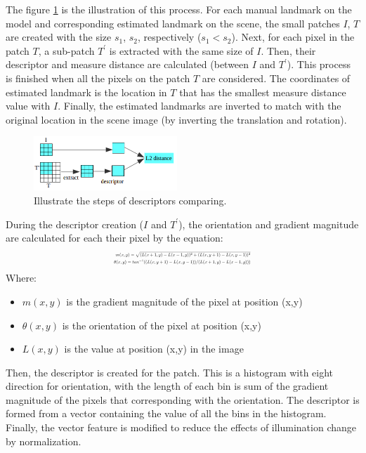\documentclass[twoside,twocolumn,10pt]{article}
\begin{document}
The figure \ref{fig:Illustrate} is the illustration of this process. For each manual landmark on the model and corresponding estimated landmark on the scene, the small patches \textit{$I$}, \textit{$T$} are created with the size $s_1$, $s_2$, respectively ($s_1 < s_2$). Next, for each pixel in the patch \textit{$T$}, a sub-patch \textit{$T^{'}$} is extracted with the same size of \textit{$I$}. Then, their descriptor and measure distance are calculated (between \textit{$I$} and \textit{$T^{'}$}). This process is finished when all the pixels on the patch \textit{$T$} are considered. The coordinates of estimated landmark is the location in \textit{$T$} that has the smallest measure distance value with \textit{$I$}. Finally, the estimated landmarks are inverted to match with the original location in the scene image (by inverting the translation and rotation).
\begin{figure}[htb]
    \centering
    \includegraphics[width=0.48\textwidth]{./images/illustration_SIFT}
    \caption{Illustrate the steps of descriptors comparing.}
    \label{fig:Illustrate}
\end{figure}

During the descriptor creation (\textit{$I$} and \textit{$T^{'}$}), the orientation and gradient magnitude are calculated for each their pixel by the equation:
\begin{equation}
\label{eq:sift}
\resizebox{.41 \textwidth}{!} 
{$
\begin{aligned}
	m(x,y) = \sqrt{(L(x+1,y) - L(x-1,y))^2 + (L(x,y+1) - L(x,y-1))^2} \\
	\theta(x,y) = tan^{-1}((L(x,y+1) - L(x,y-1))/(L(x+1,y) - L(x-1,y)))
	\end{aligned}
$}
\end{equation}
Where:
\begin{itemize}
	\item $m(x,y)$ is the gradient magnitude of the pixel at position (x,y)
	\item $\theta(x,y)$ is the orientation of the pixel at position (x,y)
	\item $L(x,y)$ is the value at position (x,y) in the image
\end{itemize}
Then, the descriptor is created for the patch. This is a histogram with eight direction for orientation, with the length of each bin is sum of the gradient magnitude of the pixels that corresponding  with the orientation. The descriptor is formed from a vector containing the value of all the bins in the histogram. Finally, the vector feature is modified to reduce the effects of illumination change by normalization.
\end{document}
